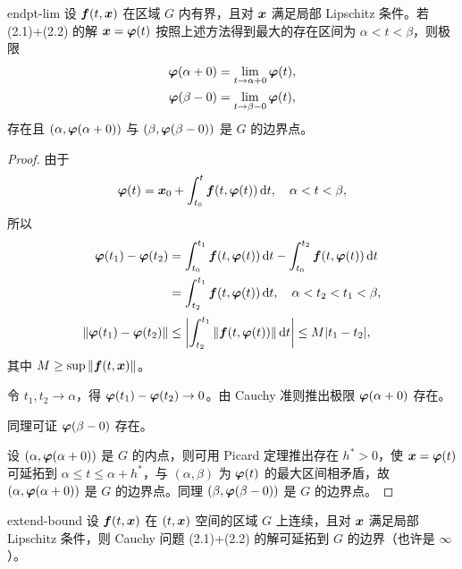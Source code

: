 \begin{theorem}{}{endpt-lim}
设 $\boldsymbol{f}(t, \boldsymbol{x})$ 在区域 $G$ 内有界，且对 $\boldsymbol{x}$ 满足局部 Lipschitz 条件。若 (2.1)+(2.2) 的解 $\boldsymbol{x} = \boldsymbol{\varphi}(t)$ 按照上述方法得到最大的存在区间为 $\alpha < t < \beta$，则极限
\begin{align*}
\boldsymbol{\varphi}(\alpha + 0) &= \lim_{t \to \alpha + 0} \boldsymbol{\varphi}(t),\\
\boldsymbol{\varphi}(\beta - 0) &= \lim_{t \to \beta - 0} \boldsymbol{\varphi}(t),
\end{align*}
存在且 $(\alpha, \boldsymbol{\varphi}(\alpha + 0))$ 与 $(\beta, \boldsymbol{\varphi}(\beta - 0))$ 是 $G$ 的边界点。
\end{theorem}

\begin{proof}
由于
\[
\boldsymbol{\varphi}(t) = \boldsymbol{x}_0 + \int_{t_0}^t \boldsymbol{f}(t, \boldsymbol{\varphi}(t))\,\mathrm{d} t, \quad \alpha < t < \beta,
\]
所以
\begin{align*}
\boldsymbol{\varphi}(t_1) - \boldsymbol{\varphi}(t_2) &= \int_{t_0}^{t_1} \boldsymbol{f}(t, \boldsymbol{\varphi}(t))\,\mathrm{d} t - \int_{t_0}^{t_2} \boldsymbol{f}(t, \boldsymbol{\varphi}(t))\,\mathrm{d} t \\
&= \int_{t_2}^{t_1} \boldsymbol{f}(t, \boldsymbol{\varphi}(t))\,\mathrm{d} t, \quad \alpha < t_2 < t_1 < \beta,\\[2pt]
\|\boldsymbol{\varphi}(t_1) - \boldsymbol{\varphi}(t_2)\| &\leq \left|\int_{t_2}^{t_1} \|\boldsymbol{f}(t, \boldsymbol{\varphi}(t))\|\,\mathrm{d} t\right| \leq M |t_1 - t_2|,
\end{align*}
其中 $M \geq \sup \|\boldsymbol{f}(t, \boldsymbol{x})\|$。

令 $t_1, t_2 \to \alpha$，得 $\boldsymbol{\varphi}(t_1) - \boldsymbol{\varphi}(t_2) \to 0$。由 Cauchy 准则推出极限 $\boldsymbol{\varphi}(\alpha + 0)$ 存在。

同理可证 $\boldsymbol{\varphi}(\beta - 0)$ 存在。

设 $(\alpha, \boldsymbol{\varphi}(\alpha + 0))$ 是 $G$ 的内点，则可用 Picard 定理推出存在 $h^* > 0$，使 $\boldsymbol{x} = \boldsymbol{\varphi}(t)$ 可延拓到 $\alpha \leq t \leq \alpha + h^*$，与 $(\alpha, \beta)$ 为 $\boldsymbol{\varphi}(t)$ 的最大区间相矛盾，故 $(\alpha, \boldsymbol{\varphi}(\alpha + 0))$ 是 $G$ 的边界点。同理 $(\beta, \boldsymbol{\varphi}(\beta - 0))$ 是 $G$ 的边界点。
\end{proof}

\begin{theorem}{}{extend-bound}
设 $\boldsymbol{f}(t, \boldsymbol{x})$ 在 $(t, \boldsymbol{x})$ 空间的区域 $G$ 上连续，且对 $\boldsymbol{x}$ 满足局部 Lipschitz 条件，则 Cauchy 问题 (2.1)+(2.2) 的解可延拓到 $G$ 的边界（也许是 $\infty$）。
\end{theorem}

